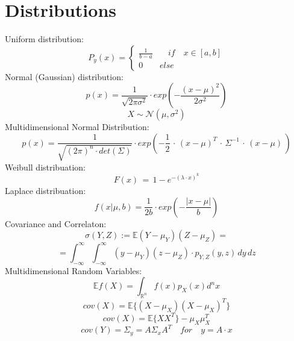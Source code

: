 \section*{Distributions}
Uniform distribution:
\begin{equation*}
{ P_{ y }(x) } = \left\{ \begin{matrix} \frac { 1 }{ b-a }  &  \quad if\quad x  \in  [a,b] \\ 0 & else \end{matrix} \right.
\end{equation*}
Normal (Gaussian) distribution:
\begin{equation*}
p(x) = \frac{1}{\sqrt{2\pi \sigma^2}}\cdot exp(-\frac{(x-\mu)^2}{2\sigma^2})
\end{equation*}
\begin{equation*}
X \sim \mathcal{N}(\mu, \sigma^2)
\end{equation*}
Multidimensional Normal Distribution:
\begin{equation*}
p(x)=\frac { 1 }{ \sqrt { (2\pi )^{ n }\cdot det(\Sigma ) }  } \cdot exp(-\frac { 1 }{ 2 } \, \cdot \, { (x-\mu ) }^{ T }\, \cdot \, \Sigma ^{ -1 }\, \cdot \, (x-\mu )\, )
\end{equation*}
Weibull distribuation: 
\begin{equation*}
F(x) \, = \, 1 - e^{-(\lambda \cdot x)^k}
\end{equation*}
Laplace distribuation:
\begin{equation*}
f(x|\mu,b) = \frac{1}{2b} \cdot exp (-\frac{|x-\mu|}{b})
\end{equation*}
Covariance and Correlaton:
\begin{equation*}
\sigma (Y,Z) := \mathbb{E} {(Y-\mu_Y)(Z-\mu_Z)} = 
\end{equation*}
\begin{equation*}
= \int_{-\infty}^{\infty}{\int_{-\infty}^{\infty}{(y-\mu_Y)(z - \mu_Z)\cdot p_{Y,Z} (y,z)\,  dy \, dz} }
\end{equation*}
Multidimensional Random Variables:
\begin{equation*}
\mathbb{E}{f(X)} = \int_{\mathbb{R}^n}{f(x)p_X(x) d^n x}
\end{equation*}
\begin{equation*}
cov(X) = \mathbb{E} \{(X-\mu_X)(X-\mu_X)^T\} 
\end{equation*}
\begin{equation*}
cov(X) = \mathbb{E} \{XX^T\} - \mu_X \mu_X^T
\end{equation*}
\begin{equation*}
cov(Y) = \Sigma_y = A \Sigma_x A^T \quad for \quad y = A \cdot x
\end{equation*}
